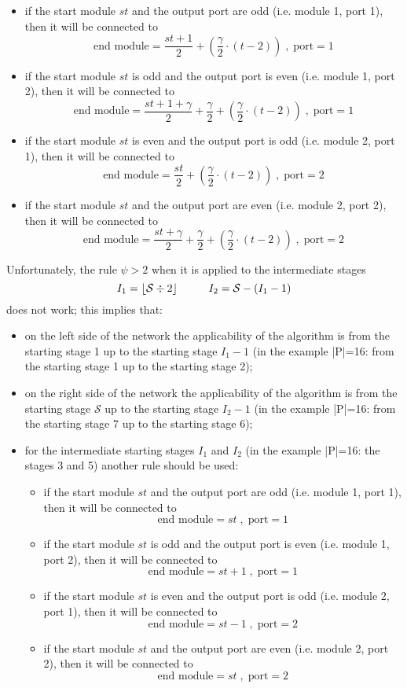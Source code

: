 \documentclass{ltxdoc}
\begin{document}
\begin{itemize}
\begin{itemize}
\item if the start module $st$ and the output port are odd (i.e. module 1, port 1), then it will be connected to  
\[\textrm{end module}=\dfrac{st+1}{2}+\left(\dfrac{\gamma}{2}\cdot (t-2)\right) \; , \; \textrm{port}=1 \]
\item if the start module $st$ is odd and the output port is even (i.e. module 1, port 2), then it will be connected to  
\[\textrm{end module}=\dfrac{st+1+\gamma}{2}+\dfrac{\gamma}{2}+\left(\dfrac{\gamma}{2}\cdot (t-2)\right)\; , \; \textrm{port}=1 \]
\item if the start module $st$ is even and the output port is odd (i.e. module 2, port 1), then it will be connected to  
\[\textrm{end module}=\dfrac{st}{2}+\left(\dfrac{\gamma}{2}\cdot (t-2)\right)\; , \; \textrm{port}=2 \]
\item if the start module $st$ and the output port are even (i.e. module 2, port 2), then it will be connected to  
\[\textrm{end module}=\dfrac{st+\gamma}{2}+\dfrac{\gamma}{2}+\left(\dfrac{\gamma}{2}\cdot (t-2)\right)\; , \; \textrm{port}=2 \]
\end{itemize}
\end{itemize}
Unfortunately, the rule $\psi>2$ when it is applied to the intermediate stages 
\[I_1=\lfloor\mathcal{S}\div 2\rfloor \hspace*{1cm} I_2=\mathcal{S}-(I_1-1)\]
does not work; this implies that:
\begin{itemize}
\item on the left side of the network the applicability of the algorithm is from the starting stage 1 up to the starting stage $I_1-1$ (in the example |P|=16: from the starting stage 1 up to the starting stage 2);
\item on the right side of the network the applicability of the algorithm is from the starting stage $\mathcal{S}$ up to the starting stage $I_2-1$ (in the example |P|=16: from the starting stage 7 up to the starting stage 6);
\item for the intermediate starting stages $I_1$ and  $I_2$ (in the example |P|=16: the stages 3 and 5) another rule should be used:
\begin{itemize}
\item if the start module $st$ and the output port are odd (i.e. module 1, port 1), then it will be connected to  
\[\textrm{end module}=st\; , \; \textrm{port}=1 \]
\item if the start module $st$ is odd and the output port is even (i.e. module 1, port 2), then it will be connected to  
\[\textrm{end module}=st+1\; , \; \textrm{port}=1 \]
\item if the start module $st$ is even and the output port is odd (i.e. module 2, port 1), then it will be connected to  
\[\textrm{end module}=st-1  \; , \; \textrm{port}=2 \]
\item if the start module $st$ and the output port are even (i.e. module 2, port 2), then it will be connected to  
\[\textrm{end module}=st\; , \; \textrm{port}=2 \]
\end{itemize}
\end{itemize}
\end{document}
